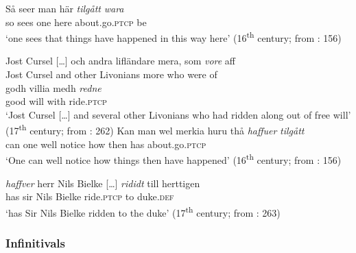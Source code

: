 \documentclass[output=paper]{langscibook}
\begin{document}
\ea\label{ex:intro:8}
\ea\label{ex:intro:8a}
\gll  Så seer   man   här \textit{tilgått} \textit{wara} \\
so   sees   one     here   about.go\textsc{.ptcp}     be\\
\glt ‘one sees that things have happened in this way here’ (16\textsuperscript{th} century; from  \citealt{Larsson2009}: 156)


\ex\label{ex:intro:8b}
\gll  Jost Cursel […] och andra   lifländare mera,   som \textit{vore} aff\\
      Jost Cursel     and other   Livonians more   who   were   of \\

\gll  godh   villia medh \textit{redne}\\
      good   will   with   ride.\textsc{ptcp}\\
    \glt `Jost Cursel […] and several other Livonians who had ridden along out of free will’ (17\textsuperscript{th} century; from \citealt{Larsson2009}: 262)
\z
\ex\label{ex:intro:9}
\ea\label{ex:intro:9a}
\gll  Kan   man   wel   merkia huru thå \textit{haffuer} \textit{tilgått} \\
can       one   well   notice   how   then     has         about.go\textsc{.ptcp}\\
\glt      ‘One can well notice how things then have happened’ (16\textsuperscript{th} century; from  \citealt{Larsson2009}: 156)

\ex\label{ex:intro:9b}
\gll \textit{haffver} herr   Nils   Bielke […] \textit{rididt} till   herttigen\\
      has     sir   Nils   Bielke     ride.\textsc{ptcp}   to    duke.\textsc{def}\\
    \glt `has Sir Nils Bielke ridden to the duke’ (17\textsuperscript{th} century; from \citealt{Larsson2009}: 263)
\z
\z

\subsubsection{ Infinitivals}\label{sec:intro:3.1.3}
\end{document}
